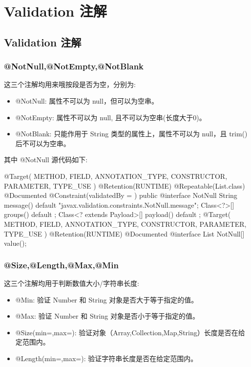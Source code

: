 \section{Validation 注解}

\subsection{Validation 注解}

\subsubsection{@NotNull,@NotEmpty,@NotBlank}

这三个注解均用来哦按段是否为空，分别为:
\begin{itemize}
    \item @NotNull: 属性不可以为 null，但可以为空串。
    \item @NotEmpty: 属性不可以为 null, 且不可以为空串(长度大于0)。
    \item @NotBlank: 只能作用于 String 类型的属性上，属性不可以为 null，且 trim() 后不可以为空串。
\end{itemize}

其中 @NotNull 源代码如下:
\begin{Java}
@Target({ METHOD, FIELD, ANNOTATION_TYPE, CONSTRUCTOR, PARAMETER, TYPE_USE })
@Retention(RUNTIME)
@Repeatable(List.class)
@Documented
@Constraint(validatedBy = { })
public @interface NotNull {
    String message() default "{javax.validation.constraints.NotNull.message}";
    Class<?>[] groups() default { };
    Class<? extends Payload>[] payload() default { };
    @Target({ METHOD, FIELD, ANNOTATION_TYPE, CONSTRUCTOR, PARAMETER, TYPE_USE })
    @Retention(RUNTIME)
    @Documented
    @interface List {
        NotNull[] value();
    }
}
\end{Java}

\subsubsection{@Size,@Length,@Max,@Min}

这三个注解均用于判断数值大小/字符串长度:
\begin{itemize}
    \item @Min: 验证 Number 和 String 对象是否大于等于指定的值。
    \item @Max: 验证 Number 和 String 对象是否小于等于指定的值。
    \item @Size(min=,max=): 验证对象（Array,Collection,Map,String）长度是否在给定范围内。
    \item @Length(min=,max=): 验证字符串长度是否在给定范围内。
\end{itemize}

